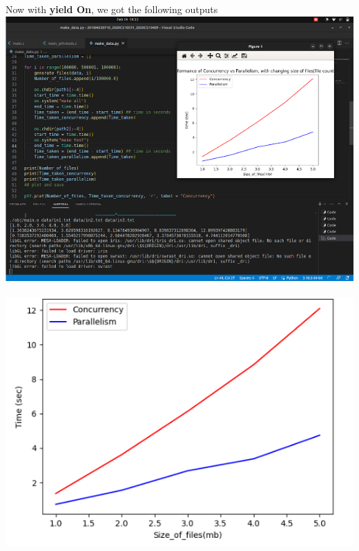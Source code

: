 \documentclass[12pt]{article}
\begin{document}
\begin{spacing}{1.2}
Now with \textbf{yield On}, we got the following outputs\\
\includegraphics[width=16cm]{images/35.png}\\
\\
\includegraphics[width=14cm]{images/36.png}\\


\end{spacing}
\end{document}
